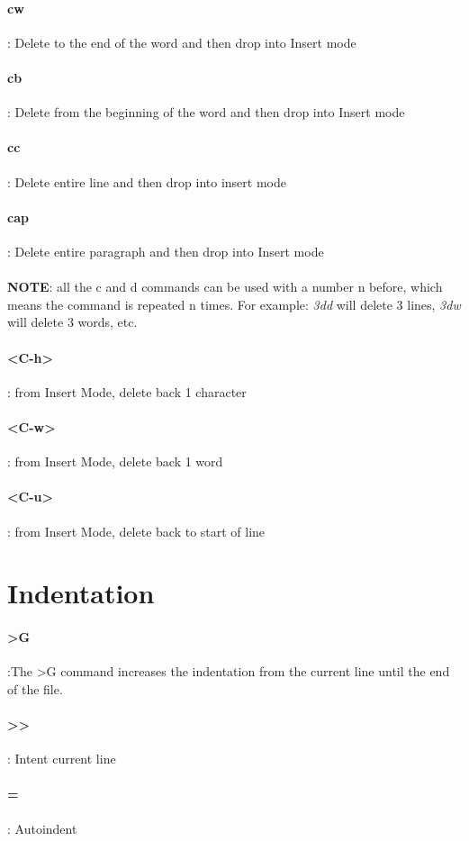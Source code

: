 \documentclass[10pt,letterpaper]{book}
\begin{document}
\paragraph{cw}: Delete to the end of the word and then drop into Insert mode
\paragraph{cb}: Delete from the beginning of the word and then drop into Insert mode
\paragraph{cc}: Delete entire line and then drop into insert mode
\paragraph{cap}: Delete entire paragraph and then drop into Insert mode
\\ \\
\textbf{NOTE}: all the c and d commands can be used with a number n before, which means the command is repeated n times. For example: \textit{3dd} will delete 3 lines, \textit{3dw} will delete 3 words, etc.
\paragraph{<C-h>}: from Insert Mode, delete back 1 character
\paragraph{<C-w>}: from Insert Mode, delete back 1 word
\paragraph{<C-u>}: from Insert Mode, delete back to start of line

\section{Indentation}
\paragraph{>G}:The >G command increases the indentation from the current line until the end of the file.
\paragraph{>>}: Intent current line
\paragraph{=}: Autoindent
\end{document}
